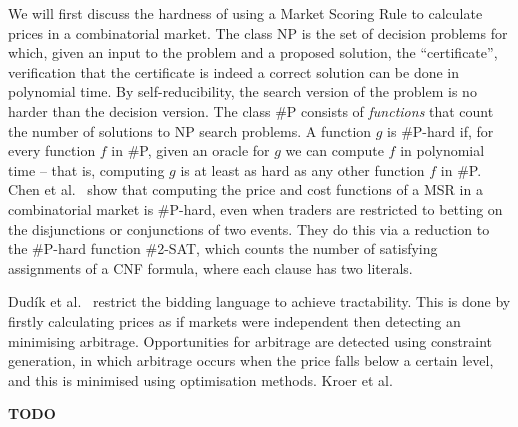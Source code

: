 We will first discuss the hardness of using a Market Scoring Rule to calculate
prices in a combinatorial market. The class NP is the set of decision problems
for which, given an input to the problem and a proposed solution, the
``certificate'', verification that the certificate is indeed a correct solution
can be done in polynomial time. By self-reducibility, the search version of the
problem is no harder than the decision version. The class \#P consists of
\emph{functions} that count the number of solutions to NP search problems. A
function $g$ is \#P-hard if, for every function $f$ in \#P, given an oracle for
$g$ we can compute $f$ in polynomial time -- that is, computing $g$ is at least
as hard as any other function $f$ in \#P. Chen et al.~\cite{Chen2008} show that
computing the price and cost functions of a MSR in a combinatorial market is
\#P-hard, even when traders are restricted to betting on the disjunctions or
conjunctions of two events. They do this via a reduction to the \#P-hard
function \textsc{\#2-SAT}, which counts the number of satisfying assignments of
a CNF formula, where each clause has two literals. 

Dud\'ik et al.~\cite{Dudik2012} restrict the bidding language to achieve
tractability. This is done by firstly calculating prices as if markets were
independent then detecting an minimising arbitrage. Opportunities for arbitrage
are detected using constraint generation, in which arbitrage occurs when the
price falls below a certain level, and this is minimised using optimisation
methods. Kroer et al.~\cite{Kroer2016} 

\textbf{TODO}
